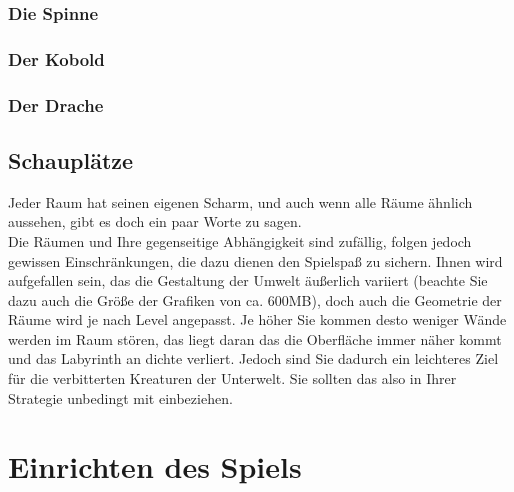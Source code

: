 \documentclass[12pt, a4paper]{scrreprt}
\begin{document}
\subsection*{Die Spinne}
\subsection*{Der Kobold}
\subsection*{Der Drache}
\section{Schauplätze}
Jeder Raum hat seinen eigenen Scharm, und auch wenn alle Räume ähnlich aussehen, gibt es doch ein paar Worte zu sagen.\\
Die Räumen und Ihre gegenseitige Abhängigkeit sind zufällig, folgen jedoch gewissen Einschränkungen, die dazu dienen den Spielspaß zu sichern. Ihnen wird aufgefallen sein, das die Gestaltung der Umwelt äußerlich variiert (beachte Sie dazu auch die Größe der Grafiken von ca. 600MB), doch auch die Geometrie der Räume wird je nach Level angepasst. Je höher Sie kommen desto weniger Wände werden im Raum stören, das liegt daran das die Oberfläche immer näher kommt und das Labyrinth an dichte verliert. Jedoch sind Sie dadurch ein leichteres Ziel für die verbitterten Kreaturen der Unterwelt. Sie sollten das also in Ihrer Strategie unbedingt mit einbeziehen.
\chapter{Einrichten des Spiels}
\end{document}
